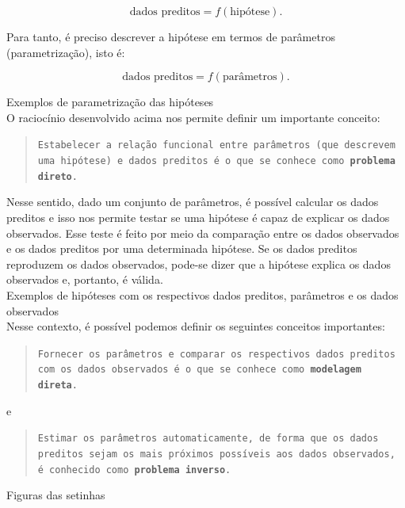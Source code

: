 \[
\text{dados preditos} = f(\text{hipótese}).
\]

\indent Para tanto, é preciso descrever a hipótese em termos de parâmetros
(parametrização), isto é:

\[
\text{dados preditos} = f(\text{parâmetros}).
\]

Exemplos de parametrização das hipóteses
\\
\indent O raciocínio desenvolvido acima nos permite definir um importante conceito:

\begin{quotation}
{\tt Estabelecer a relação funcional entre parâmetros (que descrevem uma hipótese)
e dados preditos é o que se co\-nhe\-ce como {\bf pro\-ble\-ma direto}.}
\end{quotation}

\indent Nesse sentido, dado um conjunto de parâmetros, é possível calcular os dados
preditos e isso nos permite testar se uma hipótese é capaz de explicar os dados
observados. Esse teste é feito por meio da comparação entre os dados observados
e os dados preditos por uma determinada hipótese. Se os dados preditos
reproduzem os dados observados, pode-se dizer que a hipótese explica os dados
observados e, portanto, é válida.
\\
Exemplos de hipóteses com os respectivos dados preditos, parâmetros e os dados observados
\\
\indent Nesse contexto, é possível podemos definir os seguintes conceitos importantes:

\begin{quotation}
{\tt Fornecer os parâmetros e comparar os respectivos dados preditos com os dados
observados é o que se conhece como {\bf mo\-de\-la\-gem direta}.}
\end{quotation}

e

\begin{quotation}
{\tt Estimar os parâmetros automaticamente, de forma que os dados preditos sejam os
mais próximos possíveis aos dados observados, é conhecido como {\bf problema inverso}.}
\end{quotation}

Figuras das setinhas
